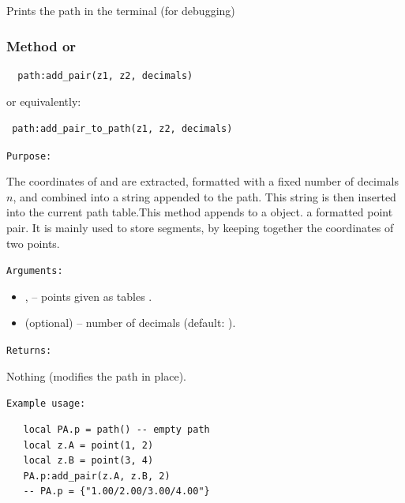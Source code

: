 Prints the path in the terminal (for debugging)

\begin{tkzexample}[latex=.45\textwidth]
\end{tkzexample}

\subsubsection{Method  or }
\label{ssub:subsubsection_name}
\begin{verbatim}
  path:add_pair(z1, z2, decimals)
\end{verbatim}

or equivalently:

\begin{verbatim}
 path:add_pair_to_path(z1, z2, decimals)
\end{verbatim}

\medskip
\texttt{Purpose: }

 The coordinates of  and  are extracted, formatted with a fixed number of decimals $n$, and combined into a string  appended to the path.
This string is then inserted into the current path table.This method appends to a  object. a formatted point pair.
It is mainly used to store segments, by keeping together the coordinates of two points.

\medskip
\texttt{Arguments: }

\begin{itemize}
  \item {},  – points given as tables .
  \item {} (optional) – number of decimals (default: ).
\end{itemize}

\medskip
\texttt{Returns: }

Nothing (modifies the path in place).

\medskip
\texttt{Example usage: }

\begin{verbatim}
   local PA.p = path() -- empty path
   local z.A = point(1, 2)
   local z.B = point(3, 4)
   PA.p:add_pair(z.A, z.B, 2)
   -- PA.p = {"1.00/2.00/3.00/4.00"}
\end{verbatim}


